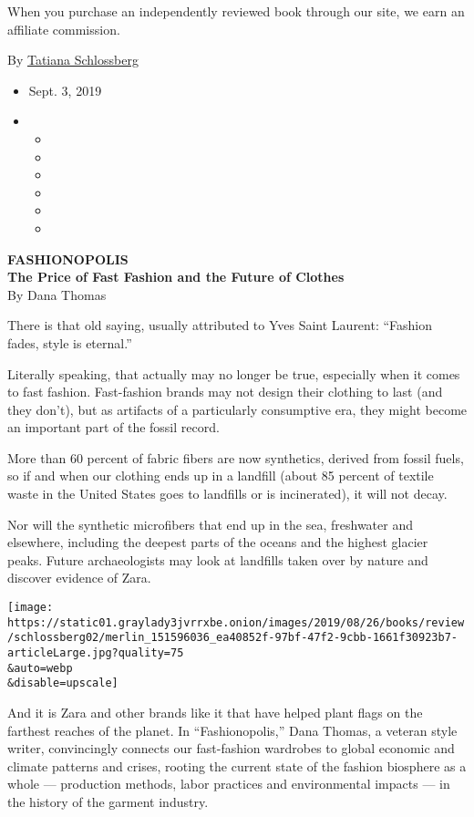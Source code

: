 When you purchase an independently reviewed book through our site, we
earn an affiliate commission.

By
\href{https://www.nytimes3xbfgragh.onion/by/tatiana-schlossberg}{Tatiana
Schlossberg}

\begin{itemize}
\item
  Sept. 3, 2019
\item
  \begin{itemize}
  \item
  \item
  \item
  \item
  \item
  \item
  \end{itemize}
\end{itemize}

\textbf{FASHIONOPOLIS}\\
\textbf{The Price of Fast Fashion and the Future of Clothes}\\
By Dana Thomas

There is that old saying, usually attributed to Yves Saint Laurent:
``Fashion fades, style is eternal.''

Literally speaking, that actually may no longer be true, especially when
it comes to fast fashion. Fast-fashion brands may not design their
clothing to last (and they don't), but as artifacts of a particularly
consumptive era, they might become an important part of the fossil
record.

More than 60 percent of fabric fibers are now synthetics, derived from
fossil fuels, so if and when our clothing ends up in a landfill (about
85 percent of textile waste in the United States goes to landfills or is
incinerated), it will not decay.

Nor will the synthetic microfibers that end up in the sea, freshwater
and elsewhere, including the deepest parts of the oceans and the highest
glacier peaks. Future archaeologists may look at landfills taken over by
nature and discover evidence of Zara.

\texttt{[image: https://static01.graylady3jvrrxbe.onion/images/2019/08/26/books/review/schlossberg02/merlin\_151596036\_ea40852f-97bf-47f2-9cbb-1661f30923b7-articleLarge.jpg?quality=75\\\&auto=webp\\\&disable=upscale]}

And it is Zara and other brands like it that have helped plant flags on
the farthest reaches of the planet. In ``Fashionopolis,'' Dana Thomas, a
veteran style writer, convincingly connects our fast-fashion wardrobes
to global economic and climate patterns and crises, rooting the current
state of the fashion biosphere as a whole --- production methods, labor
practices and environmental impacts --- in the history of the garment
industry.

